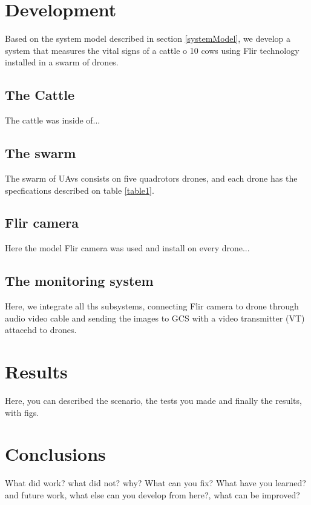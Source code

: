 \documentclass{IEEEtran}
\begin{document}
\section{Development}
Based on the system model described in section \ref{systemModel}, we develop a system that measures the vital signs of a cattle o 10 cows using Flir technology installed in a swarm of drones. 
\subsection{The Cattle}
The cattle was inside of... 
\subsection{The swarm}
The swarm of UAvs consists on five quadrotors drones, and each drone has the specfications described on table \ref{table1}.
\subsection{Flir camera}
Here the model Flir camera was used and install on every drone... 
\subsection{The monitoring system}
Here, we integrate all ths subsystems, connecting Flir camera to drone through audio video cable and sending the images to GCS with a video transmitter (VT) attacehd to drones. 
 
\section{Results}
Here, you can described the scenario, the tests you made and finally the results, with figs.

\section{Conclusions} 

What did work? what did not? why? What can you fix? What have you learned? and future work, what else can you develop from here?, what can be improved?








\end{document}
